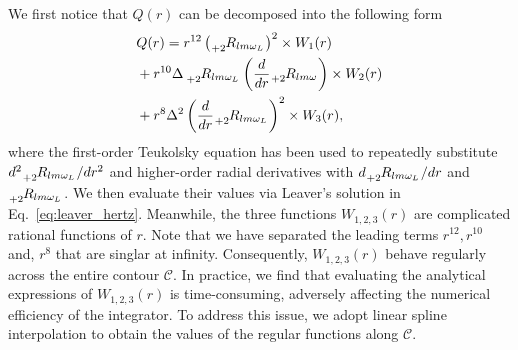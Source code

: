 \documentclass[aps,prd,amsmath,floats,floatfix, twocolumn,
superscriptaddress,nofootinbib,showpacs]{revtex4-1}
\begin{document}
We first notice that $Q(r)$ can be decomposed into the following form 
\begin{align}
    &Q(r)= r^{12} \left(\tensor[_{+2}]{{R_{lm\omega_L}}}{}\right)^2 \times W_1(r) \notag \\
    &+ r^{10}\Delta\,\tensor[_{+2}]{{R_{lm\omega_L}}}{}\left(\frac{d}{dr}\tensor[_{+2}]{{R_{lm\omega}}}{}\right) \times W_2(r) \notag \\
    &+r^8\Delta^2\left(\frac{d}{dr}\tensor[_{+2}]{{R_{lm\omega_L}}}{}\right)^2 \times W_3(r), \label{eq:leaver_source_q_R_dr_R}
\end{align}
where the first-order Teukolsky equation has been used to repeatedly substitute $d^2\tensor[_{+2}]{{R_{lm\omega_L}}}{}/dr^2$ and higher-order radial derivatives with $d\tensor[_{+2}]{{R_{lm\omega_L}}}{}/dr$ and $\tensor[_{+2}]{{R_{lm\omega_L}}}{}$. We then evaluate their values via Leaver's solution in Eq.~\eqref{eq:leaver_hertz}.
Meanwhile, the three functions $W_{1,2,3}(r)$ are complicated rational functions of $r$. Note that we have separated the leading terms $r^{12},r^{10}$ and, $r^8$ that are singlar at infinity. Consequently, $W_{1,2,3}(r)$ behave regularly across the entire contour $\mathcal{C}$. In practice, we find that evaluating the analytical expressions of $W_{1,2,3}(r)$ is time-consuming, adversely affecting the numerical efficiency of the integrator. To address this issue, we adopt linear spline interpolation to obtain the values of the regular functions along $\mathcal{C}$. 
\end{document}
